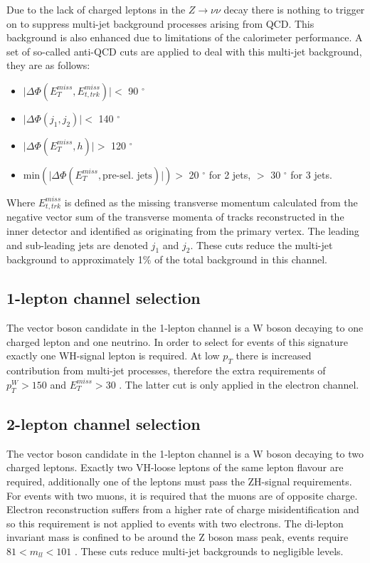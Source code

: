 Due to the lack of charged leptons in the $Z \rightarrow \nu\nu$ decay there is
nothing to trigger on to suppress multi-jet background processes arising from
QCD. This background is also enhanced due to limitations of the calorimeter
performance. A set of so-called anti-QCD cuts are applied to deal with this
multi-jet background, they are as follows:
\begin{itemize}
\item $\lvert \Delta \Phi ( E_T^{miss} , E_{t, trk}^{miss} ) \rvert <$ 90 $^\circ$
\item $\lvert \Delta \Phi ( j_1 , j_2 ) \rvert <$ 140 $^\circ$
\item $\lvert \Delta \Phi ( E_T^{miss} , h ) \rvert >$ 120 $^\circ$
\item $\text{min} ( \lvert \Delta \Phi ( E_T^{miss} , \text{pre-sel. jets}) \rvert ) >$ 20 $^\circ$ for  2 jets, $>$ 30 $^\circ$ for 3 jets.
\end{itemize}
Where $E_{t, trk}^{miss}$ is defined as the missing transverse momentum
calculated from the negative vector sum of the transverse momenta of tracks
reconstructed in the inner detector and identified as originating from the
primary vertex. The leading and sub-leading jets are denoted $j_1$ and $j_2$.
These cuts reduce the multi-jet background to approximately 1\% of the total
background in this channel.


\subsection{1-lepton channel selection}
\label{sec:1lep-selection}

The vector boson candidate in the 1-lepton channel is a W boson decaying to one
charged lepton and one neutrino. In order to select for events of this signature
exactly one WH-signal lepton is required. At low $p_T$ there is increased
contribution from multi-jet processes, therefore the extra requirements of
$p_T^{W} > 150$ \GeV and $E_T^{miss} > 30$ \GeV. The latter cut is only applied in
the electron channel.  

\subsection{2-lepton channel selection}
\label{sec:2lep-selection}

The vector boson candidate in the 1-lepton channel is a W boson decaying to two
charged leptons. Exactly two VH-loose leptons of the same lepton flavour are
required, additionally one of the leptons must pass the ZH-signal requirements.
For events with two muons, it is required that the muons are of opposite charge.
Electron reconstruction suffers from a higher rate of charge misidentification
and so this requirement is not applied to events with two electrons. The
di-lepton invariant mass is confined to be around the Z boson mass peak, events
require $81 < m_{ll} < 101$ \GeV. These cuts reduce multi-jet backgrounds to
negligible levels. 

